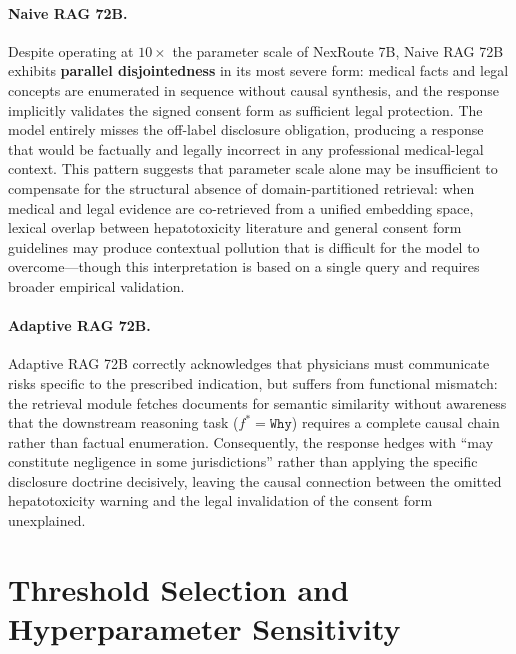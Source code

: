 \documentclass[a4paper,fleql]{cas-sc}
\begin{document}
\paragraph{Naive RAG 72B.}
Despite operating at $10\times$ the parameter scale of NexRoute 7B, Naive RAG
72B exhibits \textbf{parallel disjointedness} in its most severe form: medical
facts and legal concepts are enumerated in sequence without causal synthesis,
and the response implicitly validates the signed consent form as sufficient
legal protection. The model entirely misses the off-label disclosure
obligation, producing a response that would be factually and legally incorrect
in any professional medical-legal context. This pattern suggests that parameter scale alone may be insufficient to
compensate for the structural absence of domain-partitioned retrieval: when
medical and legal evidence are co-retrieved from a unified embedding space,
lexical overlap between hepatotoxicity literature and general consent form
guidelines may produce contextual pollution that is difficult for the model
to overcome---though this interpretation is based on a single query and
requires broader empirical validation.

\paragraph{Adaptive RAG 72B.}
Adaptive RAG 72B correctly acknowledges that physicians must communicate
risks specific to the prescribed indication, but suffers from functional
mismatch: the retrieval module fetches documents for semantic similarity
without awareness that the downstream reasoning task ($f^* = \texttt{Why}$)
requires a complete causal chain rather than factual enumeration.
Consequently, the response hedges with ``may constitute negligence in some
jurisdictions'' rather than applying the specific disclosure doctrine
decisively, leaving the causal connection between the omitted hepatotoxicity
warning and the legal invalidation of the consent form unexplained.

\section{Threshold Selection and Hyperparameter Sensitivity}
\label{app:threshold}
\end{document}
